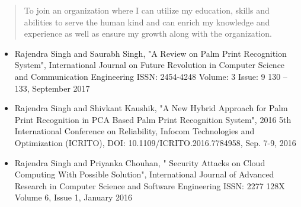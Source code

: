 \documentclass[10pt,a4paper,ragged2e,withhyper]{altacv}
\begin{document}
\begin{paracol}{2}
\begin{itemize}
\end{itemize}
















\switchcolumn

\begin{quote}
To join an organization where I can utilize my education, skills and abilities to serve the human kind and can enrich my knowledge and experience as well as ensure my growth along 
with the organization.
\end{quote}



\divider


\divider


\divider


\divider





\divider
{}
\begin{itemize}
\item Rajendra Singh and Saurabh Singh, "A Review on Palm Print Recognition System", International Journal on Future Revolution in Computer Science and Communication Engineering ISSN: 2454-4248 Volume: 3 Issue: 9 130 – 133, September 2017
\end{itemize}
\begin{itemize}
\item Rajendra Singh and Shivkant Kaushik, "A New Hybrid Approach for Palm Print Recognition in PCA Based Palm Print Recognition System", 2016 5th International Conference on Reliability, Infocom Technologies and Optimization (ICRITO), DOI: 10.1109/ICRITO.2016.7784958, Sep. 7-9, 2016
\end{itemize}
\begin{itemize}
\item Rajendra Singh and Priyanka Chouhan, " Security Attacks on Cloud Computing With Possible Solution", International Journal of Advanced Research in Computer Science and Software Engineering ISSN: 2277 128X Volume 6, Issue 1, January 2016
\end{itemize}




\end{paracol}
\end{document}
